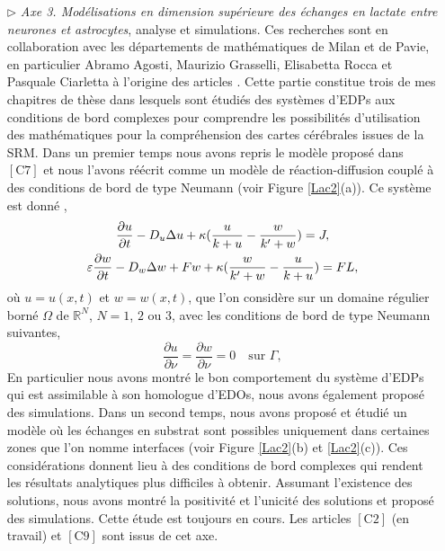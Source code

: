 \documentclass[a4paper, 12pt, twoside, openright]{article}
\begin{document}
\begin{itemize}
\begin{itemize}
\newpage
\item[$\triangleright$]\textit{Axe 3. Modélisations en dimension supérieure des échanges en lactate entre neurones et astrocytes}, analyse et simulations. Ces recherches sont en collaboration avec les départements de mathématiques de Milan et de Pavie, en particulier Abramo Agosti, Maurizio Grasselli, Elisabetta Rocca et Pasquale Ciarletta à l'origine des articles \cite{agosti2018,agosti2019}. Cette partie constitue trois de mes chapitres de thèse dans lesquels sont étudiés des systèmes d'EDPs aux conditions de bord complexes pour comprendre les possibilités d'utilisation des mathématiques pour la compréhension des cartes cérébrales issues de la SRM. 
Dans un premier temps nous avons repris le modèle proposé dans $\left[ \text{C7} \right]$ et nous l'avons réécrit comme un modèle de réaction-diffusion couplé à des conditions de bord de type Neumann (voir Figure \ref{Lac2}(a)). Ce système est donné \fat, \begin{gather*}
\frac{\partial u}{\partial t}-D_u \Delta u+\kappa ({u\over {k+u}}-{w\over {k'+w}})
=J, \\
\varepsilon \frac{\partial w}{\partial t}-D_w \Delta w+Fw
+\kappa ({w\over {k'+w}}-{u\over {k+u}})=FL,
\end{gather*}
où $u=u(x,t)$ et $w=w(x,t)$,
que l'on considère sur un domaine régulier borné $\Omega $ de
$\mathbb{R}^N$, $N=1$, $2$ ou $3$,
avec les conditions de bord de type Neumann suivantes,
$$
\frac{\partial u}{\partial \nu}=\frac{\partial w}{\partial \nu}
=0\quad\text{sur }\Gamma ,
$$
En particulier nous avons montré le bon comportement du système d'EDPs qui est assimilable à son homologue d'EDOs, nous avons également proposé des simulations. Dans un second temps, nous avons proposé et étudié un modèle où les échanges en substrat sont possibles uniquement dans certaines zones que l'on nomme interfaces (voir Figure \ref{Lac2}(b) et \ref{Lac2}(c)). Ces considérations donnent lieu à des conditions de bord complexes qui rendent les résultats analytiques plus difficiles à obtenir. Assumant l'existence des solutions, nous avons montré la positivité et l'unicité des solutions et proposé des simulations. Cette étude est toujours en cours. Les articles $\left[ \text{C2} \right]$ (en travail) et $\left[ \text{C9} \right]$ sont issus de cet axe.
\end{itemize}


\end{itemize}
\end{document}
